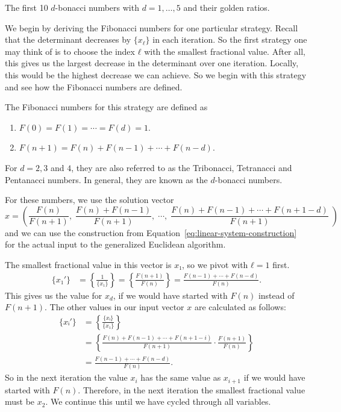 \begin{table}[tbp]
  \caption{The first 10 $d$-bonacci numbers with $d = 1, …, 5$ and their golden ratios.}
  \label{tbl:min-fibonacci}
  \centering
  
\end{table}

We begin by deriving the Fibonacci numbers for one particular strategy.
Recall that the determinant decreases by $\{x_ℓ\}$ in each iteration.
So the first strategy one may think of is to choose the index $ℓ$ with the
smallest fractional value.
After all, this gives us the largest decrease in the determinant over one iteration.
Locally, this would be the highest decrease we can achieve.
So we begin with this strategy and see how the Fibonacci numbers are defined.


\begin{definition}
  The Fibonacci numbers for this strategy are defined as
  \begin{enumerate}
    \item $F(0) = F(1) = ⋯ = F(d) = 1$.
    \item $F(n + 1) = F(n) + F(n - 1) + ⋯ + F(n - d)$.
  \end{enumerate}
  For $d = 2, 3$ and $4$, they are also referred to as the Tribonacci, Tetranacci
  and Pentanacci numbers.
  In general, they are known as the $d$-bonacci numbers.
\end{definition}

For these numbers, we use the solution vector
\[
  x =
  \left(
    \frac{F(n)}{F(n + 1)},\;
    \frac{F(n) + F(n - 1)}{F(n + 1)},\;
    ⋯,\;
    \frac{F(n) + F(n - 1) + ⋯ + F(n + 1 - d)}{F(n + 1)}\;
  \right)
\]
and we can use the construction from Equation~\ref{eq:linear-system-construction}
for the actual input to the generalized Euclidean algorithm.

The smallest fractional value in this vector is $x₁$, so we pivot with $ℓ = 1$ first.
\begin{align*}
  \{x₁'\}
  & = \left\{\frac{1}{\{x₁\}}\right\}
  = \left\{\frac{F(n + 1)}{F(n)}\right\}
  = \frac{F(n - 1) + ⋯ + F(n - d)}{F(n)}.
\end{align*}
This gives us the value for $x_d$, if we would have started with $F(n)$ instead of $F(n+1)$.
The other values in our input vector $x$ are calculated as follows:
\begin{align*}
  \{xᵢ'\}
  & = \left\{\frac{\{xᵢ\}}{\{x₁\}}\right\} \\
  & = \left\{\frac{F(n) + F(n - 1) + ⋯ + F(n + 1 - i)}{F(n + 1)} · \frac{F(n + 1)}{F(n)}\right\} \\
  & = \frac{F(n - 1) + ⋯ + F(n - d)}{F(n)}.
\end{align*}
So in the next iteration the value $x_i$ has the same value as $x_{i+1}$ if we
would have started with $F(n)$.
Therefore, in the next iteration the smallest fractional value must be $x_2$.
We continue this until we have cycled through all variables.

